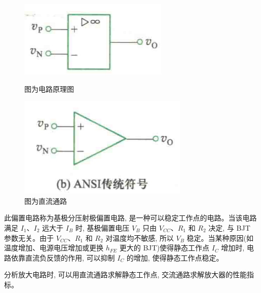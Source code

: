 \documentclass[10pt, a4paper]{article} %
\begin{document}
\begin{figure}[ht]
    \centering 
    \begin{minipage}{0.54\linewidth}
        \centering
        \includegraphics[width=\linewidth]{image/1.png}
        \caption{图为电路原理图}
    \end{minipage}
    \hfill
    \begin{minipage}{0.34\linewidth}
        \centering
        \includegraphics[width=\linewidth]{image/2.png}
        \caption{图为直流通路}
    \end{minipage}
\end{figure}

此偏置电路称为基极分压射极偏置电路, 是一种可以稳定工作点的电路。当该电路满足 $I_1$、$I_2$ 远大于 $I_B$ 时, 基极偏置电压 $V_B$ 只由 $V_{CC}$、$R_1$ 和 $R_2$ 决定, 与 BJT 参数无关。由于 $V_{CC}$、$R_1$ 和 $R_2$ 对温度均不敏感, 所以 $V_B$ 稳定。当某种原因(如温度增加、电源电压增加或更换 $h_{FE}$ 更大的 BJT)使得静态工作点 $I_C$ 增加时, 电路依靠直流负反馈的作用, 可以抑制 $I_C$ 的增加, 使得静态工作点稳定。

\newpage
分析放大电路时, 可以用直流通路求解静态工作点, 交流通路求解放大器的性能指标。
\end{document}
